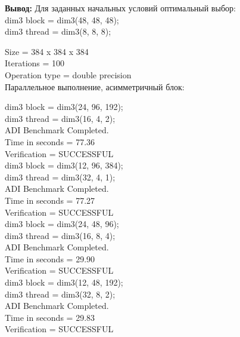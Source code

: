 \documentclass[a4paper,12pt,titlepage,draft]{article}
\begin{document}
\noindent \textbf{Вывод:} Для заданных начальных условий оптимальный выбор:\\
dim3 block = dim3(48, 48, 48);\\
dim3 thread = dim3(8, 8, 8);
\newpage

\begin{center}
    Size            =  384 x  384 x  384\\
    Iterations      =                100\\
    Operation type  =   double precision\\
    Параллельное выполнение, асимметричный блок:\\
\end{center}
\begin{minipage}{.5\textwidth}
    dim3 block = dim3(24, 96, 192);\\
    dim3 thread = dim3(16, 4, 2);\\
    ADI Benchmark Completed.\\
    Time in seconds =             77.36\\
    Verification    =         SUCCESSFUL\\

    dim3 block = dim3(12, 96, 384);\\
    dim3 thread = dim3(32, 4, 1);\\
    ADI Benchmark Completed.\\
    Time in seconds =             77.27\\
    Verification    =         SUCCESSFUL\\

    dim3 block = dim3(24, 48, 96);\\
    dim3 thread = dim3(16, 8, 4);\\
    ADI Benchmark Completed.\\
    Time in seconds =             29.90\\
    Verification    =         SUCCESSFUL\\

    dim3 block = dim3(12, 48, 192);\\
    dim3 thread = dim3(32, 8, 2);\\
    ADI Benchmark Completed.\\
    Time in seconds =             29.83\\
    Verification    =         SUCCESSFUL\\
\end{minipage}
\end{document}
